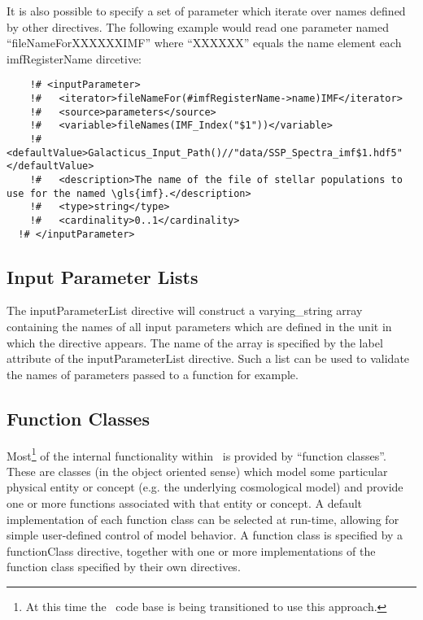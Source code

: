It is also possible to specify a set of parameter which iterate over names defined by other directives. The following example would read one parameter named ``{\normalfont \ttfamily fileNameForXXXXXXIMF}'' where ``{\normalfont \ttfamily XXXXXX}'' equals the {\normalfont \ttfamily name} element each {\normalfont \ttfamily imfRegisterName} dircetive:
\begin{lstlisting}
    !# <inputParameter>
    !#   <iterator>fileNameFor(#imfRegisterName->name)IMF</iterator>
    !#   <source>parameters</source>
    !#   <variable>fileNames(IMF_Index("$1"))</variable>
    !#   <defaultValue>Galacticus_Input_Path()//"data/SSP_Spectra_imf$1.hdf5"</defaultValue>
    !#   <description>The name of the file of stellar populations to use for the named \gls{imf}.</description>
    !#   <type>string</type>
    !#   <cardinality>0..1</cardinality>
  !# </inputParameter>
\end{lstlisting}

\subsection{Input Parameter Lists}

The {\normalfont \ttfamily inputParameterList} directive will construct a {\normalfont \ttfamily varying\_string} array containing the names of all input parameters which are defined in the unit in which the directive appears. The name of the array is specified by the {\normalfont \ttfamily label} attribute of the {\normalfont \ttfamily inputParameterList} directive. Such a list can be used to validate the names of parameters passed to a function for example.

\subsection{Function Classes}

Most\footnote{At this time the \protect\glc\ code base is being transitioned to use this approach.} of the internal functionality within \glc\ is provided by ``function classes''. These are classes (in the object oriented sense) which model some particular physical entity or concept (e.g. the underlying cosmological model) and provide one or more functions associated with that entity or concept. A default implementation of each function class can be selected at run-time, allowing for simple user-defined control of model behavior. A function class is specified by a {\normalfont \ttfamily functionClass} directive, together with one or more implementations of the function class specified by their own directives.

